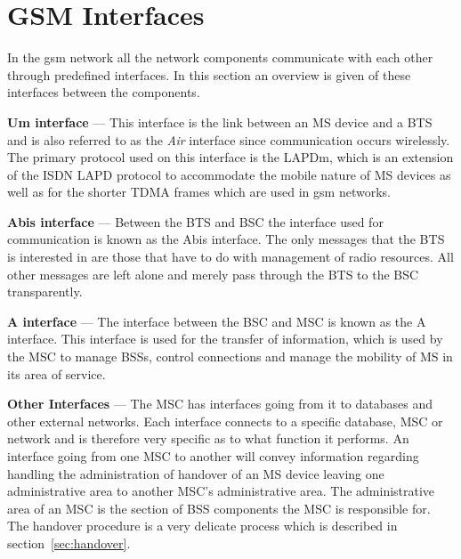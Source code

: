 \section{GSM Interfaces}
\label{sec:gsminterfaces}
In the \gls{gsm} network all the network components communicate with each other through predefined interfaces. In this section an overview is given of these interfaces between the components.
\begin{description}
  \item{\textbf{Um interface}} --- This interface is the link between an \gls{MS} device and a \gls{BTS} and is also referred to as the \emph{Air} interface since communication occurs wirelessly. The primary protocol used on this interface is the \gls{LAPDm}, which is an extension of the \gls{ISDN} LAPD protocol to accommodate the mobile nature of \gls{MS} devices as well as for the shorter \gls{TDMA} frames which are used in \gls{gsm} networks\cite{wirelesstelcoMullet,GSMSecurInTeleNetwork}.
\item{\textbf{Abis interface}} --- Between the \gls{BTS} and \gls{BSC} the interface used for communication is known as the Abis interface. The only messages that the \gls{BTS} is interested in are those that have to do with management of radio resources\cite{wirelesstelcoMullet,GSMSecurInTeleNetwork}. All other messages are left alone and merely pass through the \gls{BTS} to the \gls{BSC} transparently.
\item{\textbf{A interface}} --- The interface between the \gls{BSC} and \gls{MSC} is known as the A interface. This interface is used for the transfer of information, which is used by the \gls{MSC} to manage BSSs, control connections and manage the mobility of \gls{MS} in its area of service\cite{wirelesstelcoMullet,GSMArchitectureProtocolsServices}.
\item{\textbf{Other Interfaces}} --- The \gls{MSC} has interfaces going from it to databases and other external networks. Each interface connects to a specific database, \gls{MSC} or network and is therefore very specific as to what function it performs\cite{wirelesstelcoMullet,GSMArchitectureProtocolsServices}. An interface going from one \gls{MSC} to another will convey information regarding handling the administration of handover of an \gls{MS} device leaving one administrative area to another MSC's administrative area. The administrative area of an MSC is the section of \gls{BSS} components the \gls{MSC} is responsible for. The handover procedure is a very delicate process which is described in section~\ref{sec:handover}.
\end{description}

